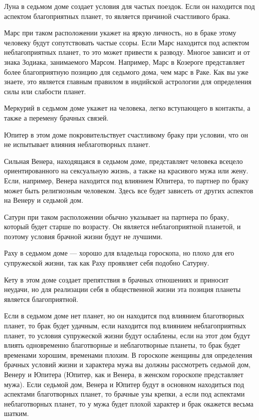Луна в седьмом доме создает условия для частых поездок. Если он находится под аспектом благоприятных планет, то является причиной счастливого брака.

Марс при таком расположении укажет на яркую личность, но в браке этому человеку будут сопутствовать частые ссоры. Если Марс находится под аспектом неблагоприятных планет, то это может привести к разводу. Многое зависит и от знака Зодиака, занимаемого Марсом. Например, Марс в Козероге представляет более благоприятную позицию для седьмого дома, чем марс в Раке. Как вы уже знаете, это является главным правилом в индийской астрологии для определения силы или слабости планет.

Меркурий в седьмом доме укажет на человека, легко вступающего в контакты, а также а перемену брачных связей.

Юпитер в этом доме покровительствует счастливому браку при условии, что он не испытывает влияния неблаготворных планет.

Сильная Венера, находящаяся в седьмом доме, представляет человека всецело ориентированного на сексуальную жизнь, а также на красивого мужа или жену. Если, например, Венера находится под влиянием Юпитера, то партнер по браку может быть религиозным человеком. Здесь все будет зависеть от других аспектов на Венеру и седьмой дом.

Сатурн при таком расположении обычно указывает на партнера по браку, который будет старше по возрасту. Он является неблагоприятной планетой, и поэтому условия брачной жизни будут не лучшими.

Раху в седьмом доме --- хорошо для владельца гороскопа, но плохо для его супружеской жизни, так как Раху проявляет себя подобно Сатурну.

Кету в этом доме создает препятствия в брачных отношениях и приносит неудачи, но для реализации себя в общественной жизни эта позиция планеты является благоприятной.

Если в седьмом доме нет планет, но он находится под влиянием благотворных планет, то брак будет удачным, если находится под влиянием неблагоприятных планет, то условия супружеской жизни будут ослаблены, если на этот дом будут влиять одновременно благотворные и неблаготворные планеты, то брак будет временами хорошим, временами плохим. В гороскопе женщины для определения брачных условий жизни и характера мужа вы должны рассмотреть седьмой дом, Венеру и Юпитера (Юпитер, как и Венера, в женском гороскопе представляет мужа). Если седьмой дом, Венера и Юпитер будут в основном находиться под аспектами благотворных планет, то брачные узы крепки, а если под аспектами неблаготворных планет, то у мужа будет плохой характер и брак окажется весьма шатким.

